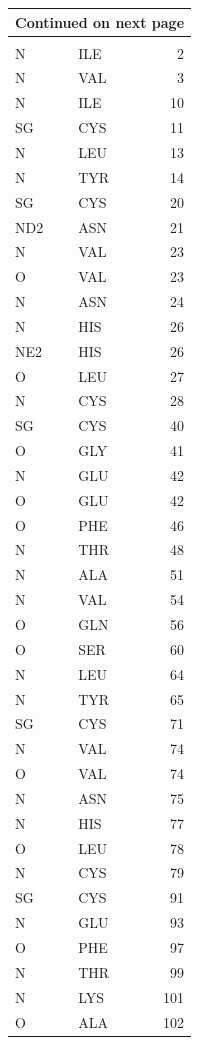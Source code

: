 \documentclass[11pt,twoside,letterpaper]{article}
\begin{document}
\begin{center}
\begin{longtable}{l>{\hspace{1.2cm}}l>{\hspace{1.2cm}}r}
	\bottomrule
	\multicolumn{3}{r}{{Continued on next page}}\\
	\bottomrule
	\endfoot
	\bottomrule
	\multicolumn{3}{r}{{End of \tablename\ \thetable{}}}\\
	\bottomrule
	\endlastfoot
		N & ILE & 2\\
		N & VAL & 3\\
		N & ILE & 10\\
		SG & CYS & 11\\
		N & LEU & 13\\
		N & TYR & 14\\
		SG & CYS & 20\\
		ND2 & ASN & 21\\
		N & VAL & 23\\
		O & VAL & 23\\
		N & ASN & 24\\
		N & HIS & 26\\
		NE2 & HIS & 26\\
		O & LEU & 27\\
		N & CYS & 28\\
		SG & CYS & 40\\
		O & GLY & 41\\
		N & GLU & 42\\
		O & GLU & 42\\
		O & PHE & 46\\
		N & THR & 48\\
		N & ALA & 51\\
		N & VAL & 54\\
		O & GLN & 56\\
		O & SER & 60\\
		N & LEU & 64\\
		N & TYR & 65\\
		SG & CYS & 71\\
		N & VAL & 74\\
		O & VAL & 74\\
		N & ASN & 75\\
		N & HIS & 77\\
		O & LEU & 78\\
		N & CYS & 79\\
		SG & CYS & 91\\
		N & GLU & 93\\
		O & PHE & 97\\
		N & THR & 99\\
		N & LYS & 101\\
		O & ALA & 102\\
	\end{longtable}
\end{center}
\end{document}
